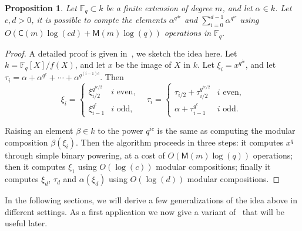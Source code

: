 \documentclass[12pt]{article}
\theoremstyle{plain}
\newtheorem{proposition}[theorem]{Proposition}
\theoremstyle{definition}
\def\F{\ensuremath{\mathbb{F}}}
\def\MM{\ensuremath{\mathsf{M}}}
\def\CC{\ensuremath{\mathsf{C}}}
\newcounter{algorithm}
\begin{document}
\begin{proposition}
  \label{prop:trace-like}
  Let $\F_q \subset k$ be a finite extension of degree $m$, and let
  $\alpha\in k$. Let $c,d>0$, it is possible to compte the elements
  $\alpha^{q^{dc}}$ and $\sum_{i=0}^{d-1}\alpha^{q^{ic}}$ using
  $O(\CC(m)\log(cd)+\MM(m)\log(q))$ operations in $\F_q$.
\end{proposition}
\begin{proof}
  A detailed proof is given in~\cite[Lemma~5.3]{von1992computing}, we
  sketch the idea here. Let $k=\F_q[X]/f(X)$, and let $x$ be the image
  of $X$ in $k$. Let $\xi_i = x^{q^{ic}}$, and let
  $\tau_i = \alpha + \alpha^{q^c} + \cdots + \alpha^{q^{(i -
      1)c}}$. Then
  \[
    \xi_i = 
    \begin{cases}
      \xi_{i / 2}^{q^{ic / 2}} & i \text{ even,} \\
      \xi_{i - 1}^{q^c} & i \text{ odd,}
    \end{cases} \quad
    \tau_i = 
    \begin{cases}
      \tau_{i / 2} + \tau_{i / 2}^{q^{ic/2}} & i \text{ even,} \\
      \alpha + \tau_{i - 1}^{q^c} & i \text{ odd.}
    \end{cases}
  \]

  Raising an element $\beta \in k$ to the power $q^{ic}$ is the same
  as computing the modular composition $\beta(\xi_i)$. Then the
  algorithm proceeds in three steps: it computes $x^q$ through simple
  binary powering, at a cost of $O(\MM(m)\log(q))$ operations; then it
  computes $\xi_1$ using $O(\log(c))$ modular compositions; finally it
  computes $\xi_d$, $\tau_d$ and $\alpha(\xi_d)$ using $O(\log(d))$
  modular compositions.
\end{proof}

In the following sections, we will derive a few generalizations of the
idea above in different settings. As a first application we now give a
variant of~\cite[Lemma~14]{shoup94} that will be useful later.
\end{document}
